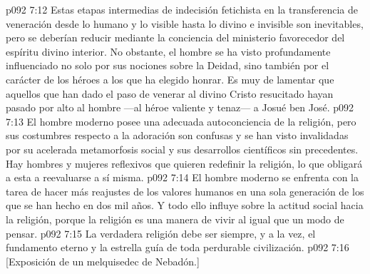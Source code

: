 \vs p092 7:12 Estas etapas intermedias de indecisión fetichista en la transferencia de veneración desde lo humano y lo visible hasta lo divino e invisible son inevitables, pero se deberían reducir mediante la conciencia del ministerio favorecedor del espíritu divino interior. No obstante, el hombre se ha visto profundamente influenciado no solo por sus nociones sobre la Deidad, sino también por el carácter de los héroes a los que ha elegido honrar. Es muy de lamentar que aquellos que han dado el paso de venerar al divino Cristo resucitado hayan pasado por alto al hombre ---al héroe valiente y tenaz--- a Josué ben José.
\vs p092 7:13 \pc El hombre moderno posee una adecuada autoconciencia de la religión, pero sus costumbres respecto a la adoración son confusas y se han visto invalidadas por su acelerada metamorfosis social y sus desarrollos científicos sin precedentes. Hay hombres y mujeres reflexivos que quieren redefinir la religión, lo que obligará a esta a reevaluarse a sí misma.
\vs p092 7:14 El hombre moderno se enfrenta con la tarea de hacer más reajustes de los valores humanos en una sola generación de los que se han hecho en dos mil años. Y todo ello influye sobre la actitud social hacia la religión, porque la religión es una manera de vivir al igual que un modo de pensar.
\vs p092 7:15 \pc La verdadera religión debe ser siempre, y a la vez, el fundamento eterno y la estrella guía de toda perdurable civilización.
\vsetoff
\vs p092 7:16 [Exposición de un melquisedec de Nebadón.]

